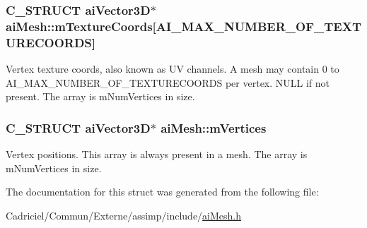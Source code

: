 \hypertarget{structai_mesh_a4a50b11d00ef50f419c75cab0f6bddd6}{
\subsubsection[{m\-Texture\-Coords}]{\setlength{\rightskip}{0pt plus 5cm}C\-\_\-\-S\-T\-R\-U\-C\-T {\bf ai\-Vector3\-D}$\ast$ ai\-Mesh\-::m\-Texture\-Coords\mbox{[}{\bf A\-I\-\_\-\-M\-A\-X\-\_\-\-N\-U\-M\-B\-E\-R\-\_\-\-O\-F\-\_\-\-T\-E\-X\-T\-U\-R\-E\-C\-O\-O\-R\-D\-S}\mbox{]}}}\label{structai_mesh_a4a50b11d00ef50f419c75cab0f6bddd6}
Vertex texture coords, also known as U\-V channels. A mesh may contain 0 to A\-I\-\_\-\-M\-A\-X\-\_\-\-N\-U\-M\-B\-E\-R\-\_\-\-O\-F\-\_\-\-T\-E\-X\-T\-U\-R\-E\-C\-O\-O\-R\-D\-S per vertex. N\-U\-L\-L if not present. The array is m\-Num\-Vertices in size. \hypertarget{structai_mesh_afd4588abb3e1c72821ae0234a3850662}{
\subsubsection[{m\-Vertices}]{\setlength{\rightskip}{0pt plus 5cm}C\-\_\-\-S\-T\-R\-U\-C\-T {\bf ai\-Vector3\-D}$\ast$ ai\-Mesh\-::m\-Vertices}}\label{structai_mesh_afd4588abb3e1c72821ae0234a3850662}
Vertex positions. This array is always present in a mesh. The array is m\-Num\-Vertices in size. 

The documentation for this struct was generated from the following file\-:\begin{DoxyCompactItemize}
\item 
Cadriciel/\-Commun/\-Externe/assimp/include/\hyperlink{ai_mesh_8h}{ai\-Mesh.\-h}\end{DoxyCompactItemize}
